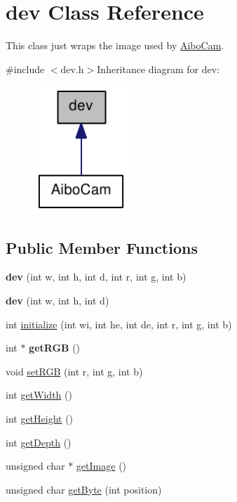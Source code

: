 \hypertarget{classdev}{
\section{dev Class Reference}
\label{classdev}
}


This class just wraps the image used by \hyperlink{classAiboCam}{AiboCam}.  


{\ttfamily \#include $<$dev.h$>$}Inheritance diagram for dev:\nopagebreak
\begin{figure}[H]
\begin{center}
\leavevmode
\includegraphics[width=102pt]{classdev__inherit__graph}
\end{center}
\end{figure}
\subsection*{Public Member Functions}
\begin{DoxyCompactItemize}
\item 
\hypertarget{classdev_a1528dde7e946aea9efeb5c25ff163af9}{
{\bfseries dev} (int w, int h, int d, int r, int g, int b)}
\label{classdev_a1528dde7e946aea9efeb5c25ff163af9}

\item 
\hypertarget{classdev_adf38a65aa0df77c0c58fb7a35bf57f2e}{
{\bfseries dev} (int w, int h, int d)}
\label{classdev_adf38a65aa0df77c0c58fb7a35bf57f2e}

\item 
int \hyperlink{classdev_aea51d02a9f5c04fdacc63b415d7fba6f}{initialize} (int wi, int he, int de, int r, int g, int b)
\item 
\hypertarget{classdev_affbd3c6d38407a67260b0805a2a996ba}{
int $\ast$ {\bfseries getRGB} ()}
\label{classdev_affbd3c6d38407a67260b0805a2a996ba}

\item 
void \hyperlink{classdev_aae6a7a4192d0bf1090456d8fa5d27a09}{setRGB} (int r, int g, int b)
\item 
int \hyperlink{classdev_adc3b057042e6069d8e2432c48418c173}{getWidth} ()
\item 
int \hyperlink{classdev_a760161504ea05e090293aff31c834634}{getHeight} ()
\item 
int \hyperlink{classdev_a676db2fb79a8b6ddf21527aafa44ddab}{getDepth} ()
\item 
unsigned char $\ast$ \hyperlink{classdev_accda40f66947d00bc9fd294f47a187f6}{getImage} ()
\item 
unsigned char \hyperlink{classdev_a220ca2f10395d25b828e9d5e72feefb7}{getByte} (int position)
\end{DoxyCompactItemize}

